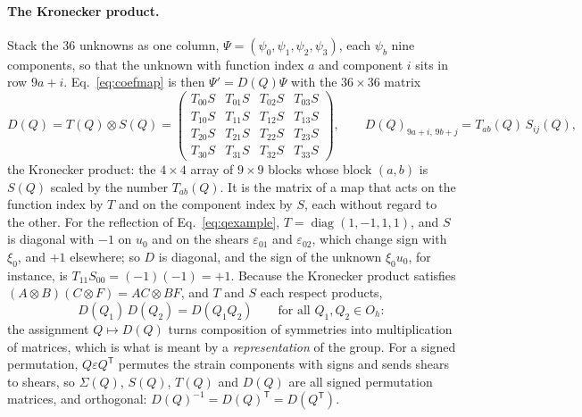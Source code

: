\documentclass[11pt,a4paper]{article}
\begin{document}
\paragraph{The Kronecker product.} Stack the $36$ unknowns as one column,
$\Psi=(\psi_0,\psi_1,\psi_2,\psi_3)$, each $\psi_b$ nine components, so that the unknown with function
index $a$ and component $i$ sits in row $9a+i$. Eq.~\eqref{eq:coefmap} is then $\Psi'=D(Q)\Psi$ with the
$36\times36$ matrix
\begin{equation}\label{eq:rep}
  D(Q)=T(Q)\otimes S(Q)=\begin{pmatrix}
    T_{00}S&T_{01}S&T_{02}S&T_{03}S\\
    T_{10}S&T_{11}S&T_{12}S&T_{13}S\\
    T_{20}S&T_{21}S&T_{22}S&T_{23}S\\
    T_{30}S&T_{31}S&T_{32}S&T_{33}S
  \end{pmatrix},\qquad
  D(Q)_{9a+i,\,9b+j}=T_{ab}(Q)\,S_{ij}(Q),
\end{equation}
the Kronecker product: the $4\times4$ array of $9\times9$ blocks whose block $(a,b)$ is $S(Q)$ scaled by
the number $T_{ab}(Q)$. It is the matrix of a map that acts on the function index by $T$ and on the
component index by $S$, each without regard to the other. For the reflection of Eq.~\eqref{eq:qexample},
$T=\operatorname{diag}(1,-1,1,1)$, and $S$ is diagonal with $-1$ on $u_0$ and on the shears
$\varepsilon_{01}$ and $\varepsilon_{02}$, which change sign with $\xi_0$, and $+1$ elsewhere; so $D$ is
diagonal, and the sign of the unknown $\xi_0u_0$, for instance, is $T_{11}S_{00}=(-1)(-1)=+1$. Because the
Kronecker product satisfies $(A\otimes B)(C\otimes F)=AC\otimes BF$, and $T$ and $S$ each respect products,
\begin{equation}\label{eq:homomorphism}
  D(Q_1)\,D(Q_2)=D(Q_1Q_2)\qquad\text{for all }Q_1,Q_2\in O_h:
\end{equation}
the assignment $Q\mapsto D(Q)$ turns composition of symmetries into multiplication of matrices, which is
what is meant by a \emph{representation} of the group. For a signed permutation, $Q\varepsilon Q^{\mathsf T}$
permutes the strain components with signs and sends shears to shears, so $\Sigma(Q)$, $S(Q)$, $T(Q)$ and
$D(Q)$ are all signed permutation matrices, and orthogonal: $D(Q)^{-1}=D(Q)^{\mathsf T}=D(Q^{\mathsf T})$.
\end{document}
